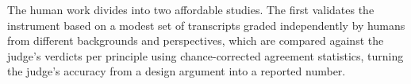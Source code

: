 The human work divides into two affordable studies. The first validates the instrument based on a modest set of transcripts graded independently by humans from different backgrounds and perspectives, which are compared against the judge's verdicts per principle using chance-corrected agreement statistics, turning the judge's accuracy from a design argument into a reported number.
